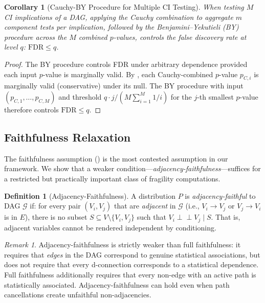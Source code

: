 \documentclass[11pt,a4paper]{article}
\newtheorem{corollary}[theorem]{Corollary}
\theoremstyle{definition}
\newtheorem{definition}[theorem]{Definition}
\theoremstyle{remark}
\newtheorem{remark}[theorem]{Remark}
\newcommand{\CI}{\perp\!\!\!\perp}
\newcommand{\DAG}{\mathcal{G}}
\begin{document}
\begin{corollary}[Cauchy-BY Procedure for Multiple CI Testing]\label{cor:cauchy_by}
When testing $M$ CI implications of a DAG, applying the Cauchy combination
to aggregate $m$ component tests per implication, followed by the
Benjamini--Yekutieli (BY) procedure across the $M$ combined $p$-values,
controls the false discovery rate at level $q$:
$\mathrm{FDR} \leq q$.
\end{corollary}

\begin{proof}
The BY procedure controls FDR under arbitrary dependence provided
each input $p$-value is marginally valid. By ,
each Cauchy-combined $p$-value $p_{C,i}$ is marginally valid (conservative)
under its null. The BY procedure with input $(p_{C,1}, \ldots, p_{C,M})$
and threshold $q \cdot j / (M \sum_{i=1}^{M} 1/i)$ for the $j$-th
smallest $p$-value therefore controls $\mathrm{FDR} \leq q$.
\end{proof}

\subsection{Faithfulness Relaxation}\label{sec:faithfulness}

The faithfulness assumption () is the most contested
assumption in our framework. We show that a weaker condition---\emph{adjacency-faithfulness}---suffices for a restricted but practically important class
of fragility computations.

\begin{definition}[Adjacency-Faithfulness]\label{def:adj_faithful}
A distribution $P$ is \emph{adjacency-faithful} to DAG $\DAG$ if: for every
pair $(V_i, V_j)$ that are \emph{adjacent} in $\DAG$ (i.e., $V_i \to V_j$
or $V_j \to V_i$ is in $E$), there is no subset $S \subseteq V \setminus
\{V_i, V_j\}$ such that $V_i \CI V_j \mid S$. That is, adjacent variables
cannot be rendered independent by conditioning.
\end{definition}

\begin{remark}\label{rem:adj_vs_full}
Adjacency-faithfulness is strictly weaker than full faithfulness: it requires
that \emph{edges} in the DAG correspond to genuine statistical associations,
but does not require that every d-connection corresponds to a statistical
dependence. Full faithfulness additionally requires that every non-edge with
an active path is statistically associated. Adjacency-faithfulness can hold
even when path cancellations create unfaithful non-adjacencies.
\end{remark}
\end{document}
